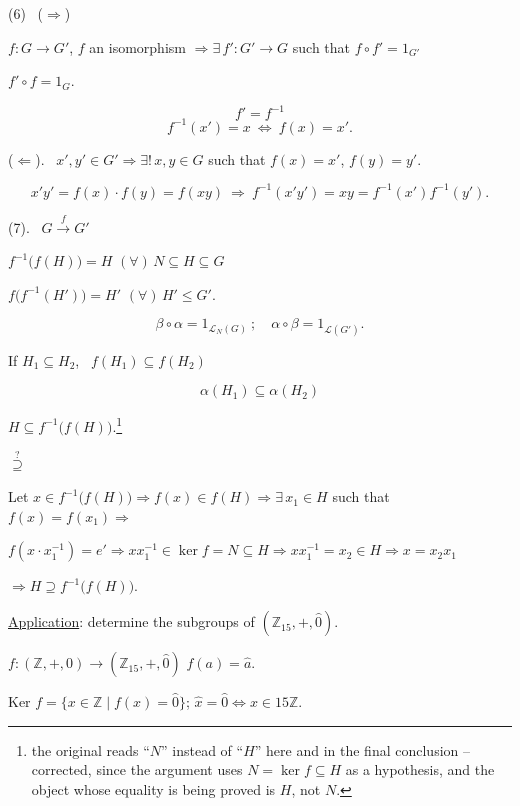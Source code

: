 \documentclass[12pt]{article}
\begin{document}
\noindent (6) \ ($\Rightarrow$)

\noindent $f:G\to G'$, $f$ an isomorphism $\Rightarrow \exists\,f':G'\to G$ such that $f\circ f'=1_{G'}$

\noindent $f'\circ f=1_G$.

\[
f'=f^{-1}
\]
\[
f^{-1}(x')=x \ \Leftrightarrow \ f(x)=x'.
\]

\bigskip
\noindent ($\Leftarrow$). \ $x',y'\in G' \Rightarrow \exists!\,x,y\in G$ such that $f(x)=x'$, $f(y)=y'$.

\[
x'y' = f(x)\cdot f(y) = f(xy) \ \Rightarrow \ f^{-1}(x'y') = xy = f^{-1}(x')f^{-1}(y').
\]

\bigskip
\noindent (7). \ $G \xrightarrow{f} G'$

\noindent $f^{-1}\big(f(H)\big)= H$ \quad $(\forall)\,N\subseteq H\subseteq G$

\noindent $f\big(f^{-1}(H')\big) = H'$ \quad $(\forall)\,H'\leq G'$.

\[
\beta\circ\alpha = 1_{\mathcal{L}_N(G)} \ ; \quad \alpha\circ\beta = 1_{\mathcal{L}(G')}.
\]

\bigskip
\noindent If $H_1\subseteq H_2$, \ $f(H_1)\subseteq f(H_2)$

\[
\alpha(H_1) \subseteq \alpha(H_2)
\]

\bigskip
\noindent $H\subseteq f^{-1}\big(f(H)\big)$.\footnote{the original reads ``$N$'' instead of ``$H$'' here and in the final conclusion -- corrected, since the argument uses $N=\ker f\subseteq H$ as a hypothesis, and the object whose equality is being proved is $H$, not $N$.}

\noindent $\overset{?}{\supseteq}$

\noindent Let $x\in f^{-1}\big(f(H)\big) \Rightarrow f(x)\in f(H) \Rightarrow \exists\,x_1\in H$ such that $f(x)=f(x_1) \Rightarrow$

\noindent $f(x\cdot x_1^{-1}) = e' \Rightarrow xx_1^{-1}\in\ker f = N\subseteq H \Rightarrow xx_1^{-1} = x_2\in H \Rightarrow x=x_2x_1$

\noindent $\Rightarrow H\supseteq f^{-1}\big(f(H)\big)$.

\bigskip
\noindent\underline{Application}: determine the subgroups of $(\mathbb{Z}_{15},+,\hat 0)$.

\noindent $f:(\mathbb{Z},+,0) \to (\mathbb{Z}_{15},+,\hat 0)$ \quad $f(a)=\hat a$.

\bigskip
\noindent Ker $f = \{x\in\mathbb{Z} \mid f(x)=\hat 0\}$; \quad $\hat x=\hat 0 \Leftrightarrow x\in 15\mathbb{Z}$.
\end{document}
